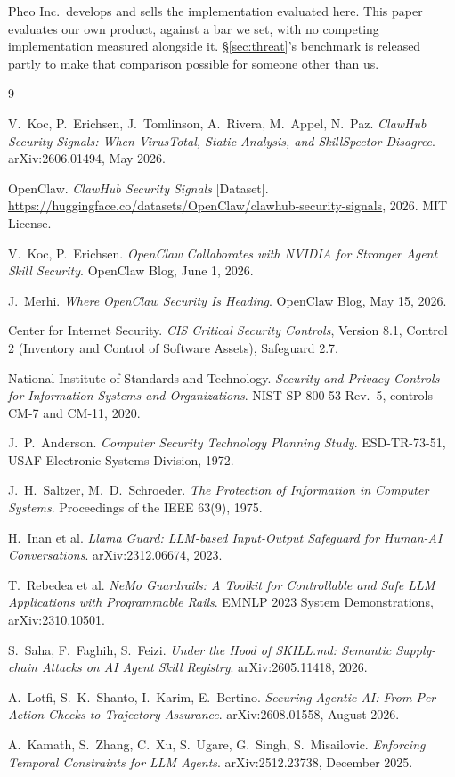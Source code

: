 \documentclass[10pt]{article}
\begin{document}
Pheo Inc.\ develops and sells the implementation evaluated here. This paper evaluates
our own product, against a bar we set, with no competing implementation measured
alongside it. \S\ref{sec:threat}'s benchmark is released partly to make that
comparison possible for someone other than us.

\begin{thebibliography}{9}

V.~Koc, P.~Erichsen, J.~Tomlinson, A.~Rivera, M.~Appel, N.~Paz.
\emph{ClawHub Security Signals: When VirusTotal, Static Analysis, and SkillSpector
Disagree}. arXiv:2606.01494, May 2026.

OpenClaw. \emph{ClawHub Security Signals} [Dataset].
\url{https://huggingface.co/datasets/OpenClaw/clawhub-security-signals}, 2026.
MIT License.

V.~Koc, P.~Erichsen. \emph{OpenClaw Collaborates with NVIDIA for Stronger Agent
Skill Security}. OpenClaw Blog, June 1, 2026.

J.~Merhi. \emph{Where OpenClaw Security Is Heading}. OpenClaw Blog, May 15, 2026.

Center for Internet Security. \emph{CIS Critical Security Controls}, Version 8.1,
Control 2 (Inventory and Control of Software Assets), Safeguard 2.7.

National Institute of Standards and Technology. \emph{Security and Privacy Controls
for Information Systems and Organizations}. NIST SP 800-53 Rev.~5, controls CM-7 and
CM-11, 2020.

J.~P.~Anderson. \emph{Computer Security Technology Planning Study}.
ESD-TR-73-51, USAF Electronic Systems Division, 1972.

J.~H.~Saltzer, M.~D.~Schroeder. \emph{The Protection of Information in Computer
Systems}. Proceedings of the IEEE 63(9), 1975.

H.~Inan et al. \emph{Llama Guard: LLM-based Input-Output Safeguard for Human-AI
Conversations}. arXiv:2312.06674, 2023.

T.~Rebedea et al. \emph{NeMo Guardrails: A Toolkit for Controllable and Safe LLM
Applications with Programmable Rails}. EMNLP 2023 System Demonstrations,
arXiv:2310.10501.

S.~Saha, F.~Faghih, S.~Feizi. \emph{Under the Hood of SKILL.md: Semantic
Supply-chain Attacks on AI Agent Skill Registry}. arXiv:2605.11418, 2026.

A.~Lotfi, S.~K.~Shanto, I.~Karim, E.~Bertino. \emph{Securing Agentic AI: From
Per-Action Checks to Trajectory Assurance}. arXiv:2608.01558, August 2026.

A.~Kamath, S.~Zhang, C.~Xu, S.~Ugare, G.~Singh, S.~Misailovic.
\emph{Enforcing Temporal Constraints for LLM Agents}. arXiv:2512.23738,
December 2025.

\end{thebibliography}
\end{document}
